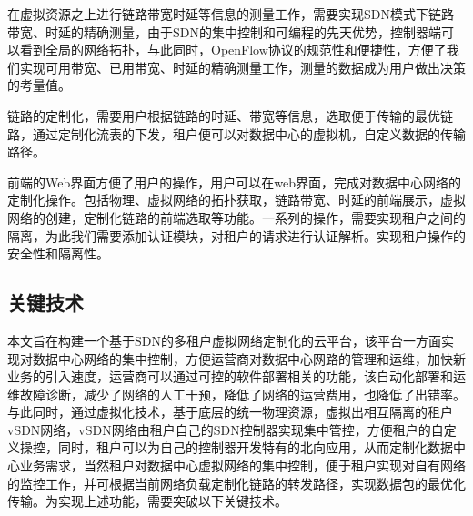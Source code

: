 在虚拟资源之上进行链路带宽时延等信息的测量工作，需要实现SDN模式下链路带宽、时延的精确测量，由于SDN的集中控制和可编程的先天优势，控制器端可以看到全局的网络拓扑，与此同时，OpenFlow协议的规范性和便捷性，方便了我们实现可用带宽、已用带宽、时延的精确测量工作，测量的数据成为用户做出决策的考量值。

链路的定制化，需要用户根据链路的时延、带宽等信息，选取便于传输的最优链路，通过定制化流表的下发，租户便可以对数据中心的虚拟机，自定义数据的传输路径。

前端的Web界面方便了用户的操作，用户可以在web界面，完成对数据中心网络的定制化操作。包括物理、虚拟网络的拓扑获取，链路带宽、时延的前端展示，虚拟网络的创建，定制化链路的前端选取等功能。一系列的操作，需要实现租户之间的隔离，为此我们需要添加认证模块，对租户的请求进行认证解析。实现租户操作的安全性和隔离性。

\subsection{关键技术}
本文旨在构建一个基于SDN的多租户虚拟网络定制化的云平台，该平台一方面实现对数据中心网络的集中控制，方便运营商对数据中心网路的管理和运维，加快新业务的引入速度，运营商可以通过可控的软件部署相关的功能，该自动化部署和运维故障诊断，减少了网络的人工干预，降低了网络的运营费用，也降低了出错率。与此同时，通过虚拟化技术，基于底层的统一物理资源，虚拟出相互隔离的租户vSDN网络，vSDN网络由租户自己的SDN控制器实现集中管控，方便租户的自定义操控，同时，租户可以为自己的控制器开发特有的北向应用，从而定制化数据中心业务需求，当然租户对数据中心虚拟网络的集中控制，便于租户实现对自有网络的监控工作，并可根据当前网络负载定制化链路的转发路径，实现数据包的最优化传输。为实现上述功能，需要突破以下关键技术。

